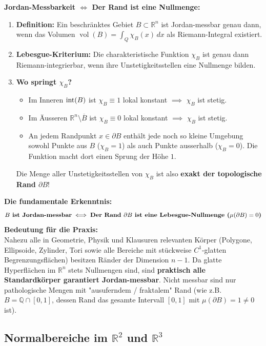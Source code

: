 \begin{remark}
    \textbf{Jordan-Messbarkeit $\iff$ Der Rand ist eine Nullmenge:}
    \begin{enumerate}
        \item \textbf{Definition:} Ein beschränktes Gebiet $B \subset \mathbb{R}^n$ ist Jordan-messbar genau dann, wenn das Volumen $\operatorname{vol}(B) = \int_Q \chi_B(x) \, dx$ als Riemann-Integral existiert.
        \item \textbf{Lebesgue-Kriterium:} Die charakteristische Funktion $\chi_B$ ist genau dann Riemann-integrierbar, wenn ihre Unstetigkeitsstellen eine Nullmenge bilden.
        \item \textbf{Wo springt $\chi_B$?}
        \begin{itemize}
            \item Im Inneren $\operatorname{int}(B)$ ist $\chi_B \equiv 1$ lokal konstant $\implies$ $\chi_B$ ist stetig.
            \item Im Äusseren $\mathbb{R}^n \setminus \overline{B}$ ist $\chi_B \equiv 0$ lokal konstant $\implies$ $\chi_B$ ist stetig.
            \item An jedem Randpunkt $x \in \partial B$ enthält jede noch so kleine Umgebung sowohl Punkte aus $B$ ($\chi_B = 1$) als auch Punkte ausserhalb ($\chi_B = 0$). Die Funktion macht dort einen Sprung der Höhe $1$.
        \end{itemize}
        Die Menge aller Unstetigkeitsstellen von $\chi_B$ ist also \textbf{exakt der topologische Rand $\partial B$}!
    \end{enumerate}
    \textbf{Die fundamentale Erkenntnis:}
    $$ \text{\textbf{$B$ ist Jordan-messbar}} \iff \text{\textbf{Der Rand $\partial B$ ist eine Lebesgue-Nullmenge ($\mu(\partial B) = 0$)}} $$
    \textbf{Bedeutung für die Praxis:} \\
    Nahezu alle in Geometrie, Physik und Klausuren relevanten Körper (Polygone, Ellipsoide, Zylinder, Tori sowie alle Bereiche mit stückweise $C^1$-glatten Begrenzungsflächen) besitzen Ränder der Dimension $n-1$. Da glatte Hyperflächen im $\mathbb{R}^n$ stets Nullmengen sind, sind \textbf{praktisch alle Standardkörper garantiert Jordan-messbar}. Nicht messbar sind nur pathologische Mengen mit "ausuferndem / fraktalem" Rand (wie z.B. $B = \mathbb{Q} \cap [0, 1]$, dessen Rand das gesamte Intervall $[0, 1]$ mit $\mu(\partial B) = 1 \neq 0$ ist).
\end{remark}


\subsection{Normalbereiche im $\mathbb{R}^2$ und $\mathbb{R}^3$}

